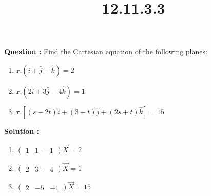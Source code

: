 \documentclass[12pt]{article}
\providecommand{\brak}[1]{\ensuremath{\left(#1\right)}}
\providecommand{\myvec}[1]{\ensuremath{\begin{pmatrix}#1\end{pmatrix}}}
\let\vec\mathbf
\begin{document}
\title{\textbf{12.11.3.3}}
\date{}
\maketitle
\textbf{Question :} Find the Cartesian equation of the following planes:


\begin{enumerate}
    \item $\vec{r}.\brak{\hat{i}+\hat{j}-\hat{k}}=2$
    \item $\vec{r}.\brak{2\hat{i}+3\hat{j}-4\hat{k}}=1$
    \item $\vec{r}.[\brak{s-2t}\hat{i}+\brak{3-t}\hat{j}+\brak{2s+t}\hat{k}]=15$
\end{enumerate}


\textbf{Solution :}
\begin{enumerate}
    \item $\myvec{1&1&-1} \Vec{X} = 2$
    \item $\myvec{2&3&-4} \Vec{X} = 1$
    \item $\myvec{2&-5&-1} \Vec{X} = 15$

\end{enumerate}
\end{document}
